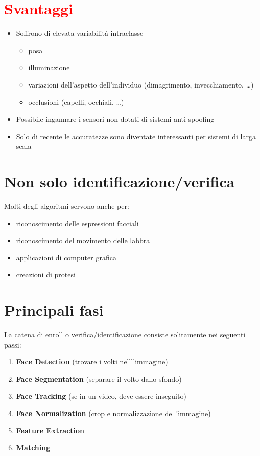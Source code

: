 \documentclass{report}
\begin{document}
\section{\textcolor{red}{Svantaggi}}
\begin{itemize}
    \item Soffrono di elevata variabilità intraclasse 
    \begin{itemize}
        \item posa 
        \item illuminazione
        \item variazioni dell'aspetto dell'individuo (dimagrimento, invecchiamento, \dots)
        \item occlusioni (capelli, occhiali, \dots)
    \end{itemize}
    \item Possibile ingannare i sensori non dotati di sistemi anti-spoofing
    \item Solo di recente le accuratezze sono diventate interessanti per sistemi di larga scala 
\end{itemize}

\section{Non solo identificazione/verifica}
Molti degli algoritmi servono anche per:
\begin{itemize}
    \item riconoscimento delle espressioni facciali 
    \item riconoscimento del movimento delle labbra 
    \item applicazioni di computer grafica 
    \item creazioni di protesi 
\end{itemize}

\section{Principali fasi}
La catena di enroll o verifica/identificazione consiste solitamente nei seguenti passi:
\begin{enumerate}
    \item \textbf{Face Detection} (trovare i volti nelll'immagine)
    \item \textbf{Face Segmentation} (separare il volto dallo sfondo)
    \item \textbf{Face Tracking} (se in un video, deve essere inseguito)
    \item \textbf{Face Normalization} (crop e normalizzazione dell'immagine)
    \item \textbf{Feature Extraction}
    \item \textbf{Matching}
\end{enumerate}
\end{document}
